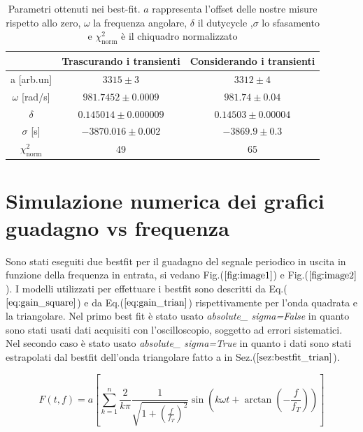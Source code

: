 \documentclass{article}
\begin{document}
            \begin{table}[H]
                \centering
                \begin{tabular}{ccc}
                    \hline
                               & Trascurando i transienti              &Considerando i transienti\\
                    \hline
                    a [arb.un]          & $3315 \pm 3$                          & $3312\pm 4$    \\
                    $\omega$ [rad/s]    & $981.7452\pm 0.0009$                  & $981.74\pm 0.04$ \\
                    $\delta$            & $0.145014\pm 0.000009$                & $0.14503\pm 0.00004$   \\
                    $\sigma$ [s]        & $-3870.016 \pm 0.002$                 & $-3869.9 \pm 0.3$  \\
                    $\chi^{2}_{\text{norm}}$   & 49                                    & 65 \\
                    \hline
                \end{tabular}
                \caption{Parametri ottenuti nei best-fit. $a$ rappresenta l'offset delle nostre misure rispetto allo zero, $\omega$ la frequenza angolare, $\delta$ il dutycycle ,$\sigma$ lo sfasamento e $\chi^2_{\text{norm}}$ è il chiquadro normalizzato}
                \label{tab:bestfit_train}
            \end{table}
\section{Simulazione numerica dei grafici guadagno vs frequenza}
    Sono stati eseguiti due bestfit per il guadagno del segnale periodico in uscita
     in funzione della frequenza in entrata, si vedano 
     Fig.($\ref{fig:image1}$) e Fig.($\ref{fig:image2}$). 
      I modelli utilizzati per effettuare i bestfit sono descritti da Eq.($\ref{eq:gain_square}$) 
      e da Eq.($\ref{eq:gain_trian}$) rispettivamente per l'onda quadrata e la triangolare. 
      Nel primo best fit è stato usato \emph{absolute\_ sigma=False} in quanto  
      sono stati usati dati acquisiti con l'oscilloscopio, soggetto ad errori sistematici.
      Nel secondo caso è stato usato \emph{absolute\_ sigma=True} in quanto i dati sono 
      stati estrapolati dal bestfit dell'onda triangolare fatto a in 
      Sez.($\ref{sez:bestfit_trian}$).
    
      \begin{equation}
        F(t, f) = a \left[\sum_{k=1}^n \frac{2}{k\pi} \frac{1}{\sqrt{1 + \left( \frac{f}{f_T} \right)^2}} \sin{\left(k\omega t + \arctan{\left(-\frac{f}{f_T}\right)} \right)}\right]
        \label{eq:gain_square}
    \end{equation}
\end{document}
